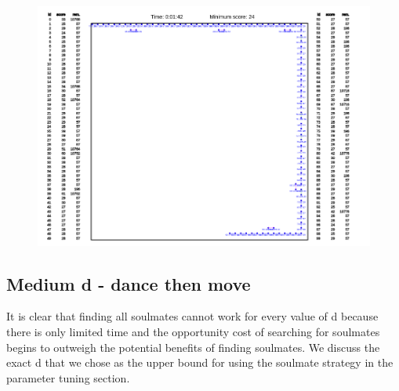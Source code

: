\begin{figure}[h]
\center
\includegraphics[scale=0.5]{smalld.png}
\caption{}
\label{fig:small d}
\end{figure}

\subsection{Medium d - dance then move}
It is clear that finding all soulmates cannot work for every value of d because there is only limited time and the opportunity cost of searching for soulmates begins to outweigh the potential benefits of finding soulmates. We discuss the exact d that we chose as the upper bound for using the soulmate strategy in the parameter tuning section.\\
